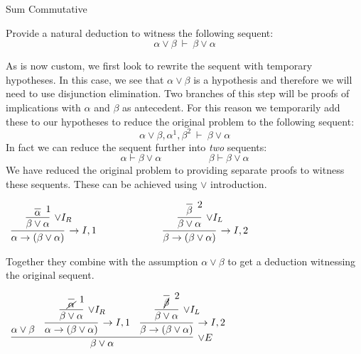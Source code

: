 \documentclass{book}
\begin{document}
    \begin{eg}{Sum Commutative}

        Provide a natural deduction to witness the following sequent: $$\alpha \lor \beta \ \vdash \ \beta \lor \alpha $$

        As is now custom, we first look to rewrite the sequent with temporary hypotheses. In this case, we see that $\alpha \lor \beta$ is a hypothesis and therefore we will need to use disjunction elimination. Two branches of this step will be proofs of implications with $\alpha$ and $\beta$ as antecedent. For this reason we temporarily add these to our hypotheses to reduce the original problem to the following sequent: $$\alpha \lor \beta, \alpha^{1}, \beta^{2} \ \vdash \ \beta \lor \alpha $$
        In fact we can reduce the sequent further into \emph{two} sequents: $$\alpha \vdash \beta \lor \alpha \hspace{2cm} \beta \vdash \beta \lor \alpha$$
        We have reduced the original problem to providing separate proofs to witness these sequents. These can be achieved using $\lor$ introduction. 

        \begin{center}
            $\begin{array}{c c}
                \infer[\to I,1]{\alpha \to (\beta \lor \alpha)}
                        {\infer[\lor I_{R}]{\beta \lor \alpha}
                            {\infer[1]{\alpha}
                                {}}}

                    \hspace{1cm}
                &
                    \hspace{1cm}

                \infer[\to I,2]{\beta \to (\beta \lor \alpha)}
                        {\infer[\lor I_{L}]{\beta \lor \alpha}
                            {\infer[2]{\beta}
                                {}}}
            \end{array}$
        \end{center}

        Together they combine with the assumption $\alpha \lor \beta$ to get a deduction witnessing the original sequent. 

        \begin{center}
            $\begin{array}{c}
                \infer[\lor E]{\beta \lor \alpha}
                    {\alpha \lor \beta
                    &
                    \infer[\to I,1]{\alpha \to (\beta \lor \alpha)}
                        {\infer[\lor I_{R}]{\beta \lor \alpha}
                            {\infer[1]{\cancel{\alpha}}
                                {}}}
                    &
                    \infer[\to I,2]{\beta \to (\beta \lor \alpha)}
                        {\infer[\lor I_{L}]{\beta \lor \alpha}
                            {\infer[2]{\cancel{\beta}}
                                {}}}}
            \end{array}$
        \end{center}

        
    \end{eg}
\end{document}

